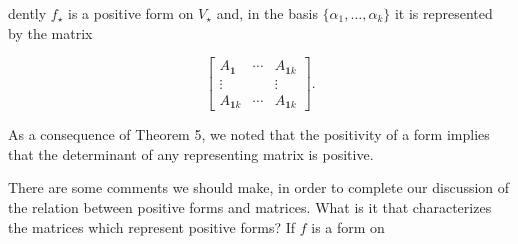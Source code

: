 dently \(f_{\star}\) is a positive form on \(V_{\star}\) and, in the basis \(\{\alpha_{1},\ldots,\alpha_{k}\}\) it is represented by the matrix

\[\begin{bmatrix}A_{\mathbf{1}}&\cdots&A_{\mathbf{1}k}\\ \vdots&&\vdots\\ A_{\mathbf{1}k}&\cdots&A_{\mathbf{1}k}\end{bmatrix}.\]

As a consequence of Theorem 5, we noted that the positivity of a form implies that the determinant of any representing matrix is positive.

There are some comments we should make, in order to complete our discussion of the relation between positive forms and matrices. What is it that characterizes the matrices which represent positive forms? If \(f\) is a form on 